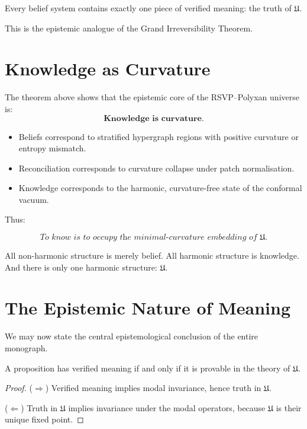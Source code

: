 \begin{corollary}
Every belief system contains exactly one piece of verified meaning: the truth of $\mathfrak{U}$.
\end{corollary}

This is the epistemic analogue of the Grand Irreversibility Theorem.


\section{Knowledge as Curvature}

The theorem above shows that the epistemic core of the RSVP--Polyxan universe is:
\[
\textbf{Knowledge is curvature.}
\]

\begin{itemize}
\item Beliefs correspond to stratified hypergraph regions with positive curvature or
entropy mismatch.
\item Reconciliation corresponds to curvature collapse under patch normalisation.
\item Knowledge corresponds to the harmonic, curvature-free state of the conformal vacuum.
\end{itemize}

Thus:

\[
\textit{To know is to occupy the minimal-curvature embedding of $\mathfrak{U}$.}
\]

All non-harmonic structure is merely belief.
All harmonic structure is knowledge.
And there is only one harmonic structure: $\mathfrak{U}$.


\section{The Epistemic Nature of Meaning}

We may now state the central epistemological conclusion of the entire monograph.

\begin{theorem}
A proposition has verified meaning if and only if it is provable in the theory of
$\mathfrak{U}$.
\end{theorem}

\begin{proof}
($\Rightarrow$) Verified meaning implies modal invariance, hence truth in $\mathfrak{U}$.

($\Leftarrow$) Truth in $\mathfrak{U}$ implies invariance under the modal operators,
because $\mathfrak{U}$ is their unique fixed point.
\end{proof}


